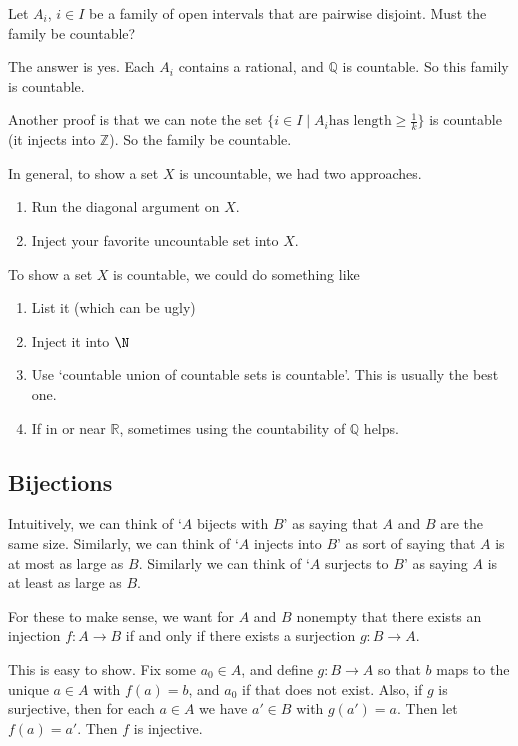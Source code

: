 \documentclass[a4paper]{scrartcl}
\begin{document}
\begin{example}
	Let $A_i$, $i \in I$ be a family of open intervals that are pairwise disjoint. Must the family be countable?

	The answer is yes. Each $A_i$ contains a rational, and $\mathbb{Q}$ is countable. So this family is countable. 

	Another proof is that we can note the set $\{i \in I \mid A_i \text{has length} \geq \frac{1}{k} \}$ is countable (it injects into $\mathbb{Z}$). So the family be countable.
\end{example}

In general, to show a set $X$ is uncountable, we had two approaches.
\begin{enumerate}
	\item Run the diagonal argument on $X$.
	\item Inject your favorite uncountable set into $X$.
\end{enumerate}
To show a set $X$ is countable, we could do something like
\begin{enumerate}
	\item List it (which can be ugly)
	\item Inject it into $\N$
	\item Use `countable union of countable sets is countable'. This is usually the best one.
	\item If in or near $\mathbb{R}$, sometimes using the countability of $\mathbb{Q}$ helps.
\end{enumerate}

\subsection{Bijections}

Intuitively, we can think of `$A$ bijects with $B$' as saying that $A$ and $B$ are the same size. Similarly, we can think of `$A$ injects into $B$' as sort of saying that $A$ is at most as large as $B$. Similarly we can think of `$A$ surjects to $B$' as saying $A$ is at least as large as $B$.

For these to make sense, we want for $A$ and $B$ nonempty that there exists an injection $f : A \rightarrow B$ if and only if there exists a surjection $g : B \rightarrow A$.

This is easy to show. Fix some $a_0 \in A$, and define $g: B \rightarrow A$ so that $b$ maps to the unique $a \in A$ with $f(a) = b$, and $a_0$ if that does not exist. Also, if $g$ is surjective, then for each $a \in A$ we have $a' \in B$ with $g(a') = a$. Then let $f(a) = a'$. Then $f$ is injective.
\end{document}
